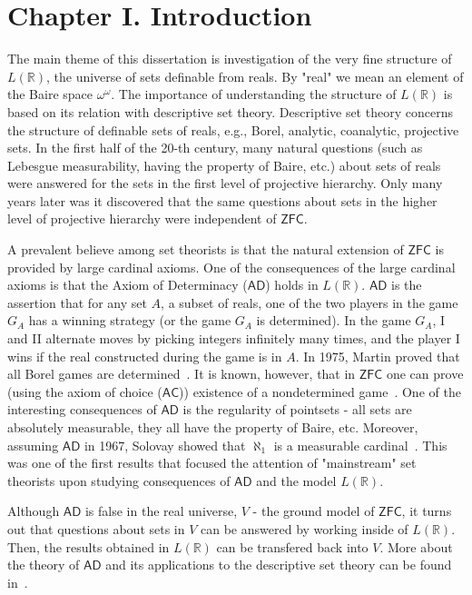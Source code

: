 \documentclass[bibother]{asl}
\theoremstyle{definition}
\theoremstyle{remark}
\newcommand{\ad}{\textsf{AD}}
\newcommand{\zfc}{\textsf{ZFC}}
\newcommand{\ac}{\textsf{AC}}
\newcommand{\ww}{\omega^\omega}
\newcommand{\LR}{{L(\mathbb{R})}}
\newcommand{\al}[1]{{\aleph_{#1}}}
\begin{document}
\section{Chapter I. Introduction}
The main theme of this dissertation is investigation of the very fine structure of $\LR$,
the universe of sets definable from reals. By "real" we mean an element of the Baire space $\ww$.
The importance of understanding the structure of $\LR$ is based on its relation with descriptive set theory.
Descriptive set theory concerns the structure of definable sets of reals, e.g., Borel, analytic, coanalytic, projective sets.
In the first half of the 20-th century, many natural questions (such as Lebesgue measurability, having the property of Baire, etc.)
about sets of reals were answered for the sets in the first level of projective hierarchy. Only many years later was it discovered 
that the same questions about sets in the higher level of projective hierarchy were independent of $\zfc$.

A prevalent believe among set theorists is that the natural extension of $\zfc$ is provided by large cardinal axioms.
One of the consequences of the large cardinal axioms is that the Axiom of Determinacy ($\ad$) holds in $\LR$.
$\ad$ is the assertion that for any set $A$, a subset of reals, one of the two players in the game $G_A$ has a 
winning strategy (or the game $G_A$ is determined). In the game $G_A$, I and II alternate moves by picking integers infinitely many times,
and the player I wins if the real constructed during the game is in $A$. In 1975, Martin proved that all Borel games are determined~\cite{Ma}.
It is known, however, that in $\zfc$ one can prove (using the axiom of choice ($\ac$)) existence of a nondetermined game~\cite{MY}.
One of the interesting consequences of $\ad$ is the regularity of pointsets - all sets are absolutely measurable, 
they all have the property of Baire, etc.
Moreover, assuming $\ad$ in 1967, Solovay showed that $\al{1}$ is a measurable cardinal~\cite{So}. 
This was one of the first results that focused the attention of "mainstream" set theorists upon studying consequences
of $\ad$ and the model $\LR$.

Although $\ad$ is false in the real universe, $V$ - the ground model of $\zfc$, it turns out that questions about sets in $V$
can be answered by working inside of $\LR$.
Then, the results obtained in $\LR$ can be transfered back into $V$.
More about the theory of $\ad$ and its applications to the descriptive set theory can be found in~\cite{Mo, Ke}.
\end{document}
